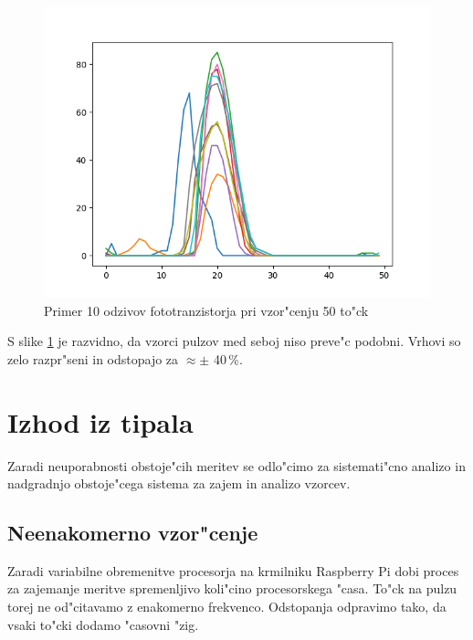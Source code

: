 \documentclass[11pt,a4paper]{article}
\begin{document}
\begin{figure}[H]
	\begin{center}
		\includegraphics[width=12cm]{pulses_old.png}
		\caption{Primer 10 odzivov fototranzistorja pri vzor"cenju 50 to"ck}
		\label{pulses-old}
	\end{center}
\end{figure}

S slike \ref{pulses-old} je razvidno, da vzorci pulzov med seboj niso preve"c podobni. Vrhovi so zelo razpr"seni in odstopajo za $ \approx \pm $ 40\,\%.

\clearpage

\section{Izhod iz tipala}
Zaradi neuporabnosti obstoje"cih meritev se odlo"cimo za sistemati"cno analizo in nadgradnjo obstoje"cega sistema za zajem in analizo vzorcev.

\subsection{Neenakomerno vzor"cenje}
Zaradi variabilne obremenitve procesorja na krmilniku Raspberry Pi dobi proces za zajemanje meritve spremenljivo koli"cino procesorskega "casa. To"ck na pulzu torej ne od"citavamo z enakomerno frekvenco. Odstopanja odpravimo tako, da vsaki to"cki dodamo "casovni "zig.
\end{document}

